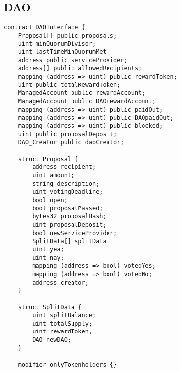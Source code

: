 \documentclass[9pt,oneside]{amsart}
\begin{document}
\subsection{DAO} \label{DAO}
\begin{verbatim}
contract DAOInterface {
    Proposal[] public proposals;
    uint minQuorumDivisor;
    uint lastTimeMinQuorumMet;
    address public serviceProvider;
    address[] public allowedRecipients;
    mapping (address => uint) public rewardToken;
    uint public totalRewardToken;
    ManagedAccount public rewardAccount;
    ManagedAccount public DAOrewardAccount;
    mapping (address => uint) public paidOut;
    mapping (address => uint) public DAOpaidOut;
    mapping (address => uint) public blocked;
    uint public proposalDeposit;
    DAO_Creator public daoCreator;

    struct Proposal {
        address recipient;
        uint amount;
        string description;
        uint votingDeadline;
        bool open;
        bool proposalPassed;
        bytes32 proposalHash;
        uint proposalDeposit;
        bool newServiceProvider;
        SplitData[] splitData;
        uint yea;
        uint nay;
        mapping (address => bool) votedYes;
        mapping (address => bool) votedNo;
        address creator;
    }

    struct SplitData {
        uint splitBalance;
        uint totalSupply;
        uint rewardToken;
        DAO newDAO;
    }

    modifier onlyTokenholders {}
  

\end{verbatim}
\end{document}
